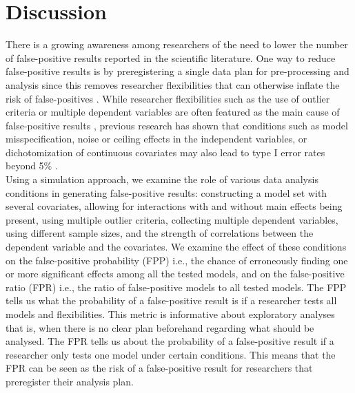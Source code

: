 \section{Discussion}
There is a growing awareness among researchers of the need to lower the number of false-positive results reported in the scientific literature. One way to reduce false-positive results is by preregistering a single data plan for pre-processing and analysis since this removes researcher flexibilities that can otherwise inflate the risk of false-positives \citep{simmons2018}. While researcher flexibilities such as the use of outlier criteria or multiple dependent variables are often featured as the main cause of false-positive results \citep{John2012}, previous research has shown that conditions such as model misspecification, noise or ceiling effects in the independent variables, or dichotomization of continuous covariates may also lead to type I error rates beyond 5\% \citep{Dennis2019, Litiere2007, Brunner2009, Austin2003, Austin2004}. \\

Using a simulation approach, we examine the role of various data analysis conditions in generating false-positive results: constructing a model set with several covariates, allowing for interactions with and without main effects being present, using multiple outlier criteria, collecting multiple dependent variables, using different sample sizes, and the strength of correlations between the dependent variable and the covariates. We examine the effect of these conditions on the false-positive probability (FPP) i.e., the chance of erroneously finding one or more significant effects among all the tested models, and on the false-positive ratio (FPR) i.e., the ratio of  false-positive models to all tested models. The FPP tells us what the probability of a false-positive result is if a researcher tests all models and flexibilities. This metric is informative about exploratory analyses that is, when there is no clear plan beforehand regarding what should be analysed. The FPR tells us about the probability of a false-positive result if a researcher only tests one model under certain conditions. This means that the FPR can be seen as the risk of a false-positive result for researchers that preregister their analysis plan. \\


